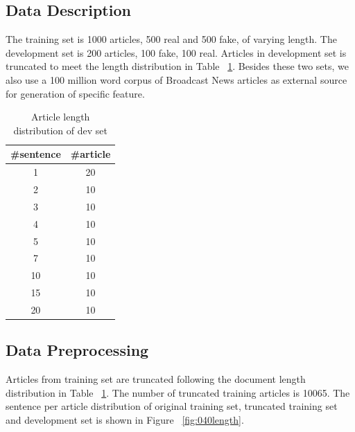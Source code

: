 \subsection{Data Description}
The training set is 1000 articles, 500 real and 500 fake, of varying length. The development set is 200 articles, 100 fake, 100 real. Articles in development set is truncated to meet the length distribution in Table ~\ref{tab:040dev}. Besides these two sets, we also use a 100 million word corpus of Broadcast News articles as external source for generation of specific feature.
\begin{table}
	\begin{center}
		\begin{tabular}{|c|c|}
		\hline
		\#sentence&\#article\\
		\hline
		1&20\\
		2&10\\
		3&10\\
		4&10\\
		5&10\\
		7&10\\
		10&10\\
		15&10\\
		20&10\\
		\hline
		\end{tabular}
	\end{center}
	\label{tab:040dev}
	\caption{Article length distribution of dev set}
\end{table}
\subsection{Data Preprocessing}
Articles from training set are truncated following the document length distribution in Table ~\ref{tab:040dev}. The number of truncated training articles is 10065. The sentence per article distribution of original training set, truncated training set and development set is shown in Figure ~\ref{fig:040length}.

